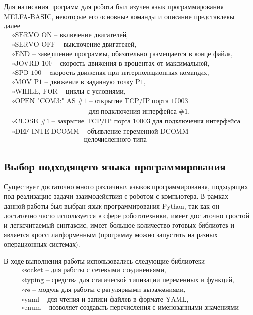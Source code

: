 \documentclass[a4paper,14pt]{extarticle}
\begin{document}
Для написания программ для робота был изучен язык программирования
MELFA-BASIC, некоторые его основные команды и описание представлены
далее
\begin{align*}
    &\circ\text{SERVO ON -- включение двигателей,}\\
    &\circ\text{SERVO OFF -- выключение двигателей,}\\
    &\circ\text{END -- завершение программы, обязательно размещается в конце файла,}\\
    &\circ\text{JOVRD 100 -- скорость движения в процентах от максимальной,}\\
    &\circ\text{SPD 100 -- скорость движения при интерполяционных командах,}\\
    &\circ\text{MOV P1 -- движение в заданную точку P1,}\\
    &\circ\text{WHILE, FOR -- циклы с условиями,}\\
    &\circ\text{OPEN "COM3:" AS \#1 -- открытие TCP/IP порта 10003}\\
    &\,\,\,\,\,\,\,\,\,\,\,\,\,\,\,\,\,\,\,\,\,\,\,\,\,\,\,\,\,\,\,\,\,\,\,\,\,\,\,\,\,\,\,\,\,\,\,\,\,\,\,\,\,\,\,\,\,\,\,\,\,\,\,\,\,\,\,\text{для подключения интерфейса \#1,}\\
    &\circ\text{CLOSE \#1 -- закрытие TCP/IP порта 10003 для подключения интерфейса \#1,}\\
    &\circ\text{DEF INTE DCOMM -- объявление переменной DCOMM}\\
    &\,\,\,\,\,\,\,\,\,\,\,\,\,\,\,\,\,\,\,\,\,\,\,\,\,\,\,\,\,\,\,\,\,\,\,\,\,\,\,\,\,\,\,\,\,\,\,\,\,\,\,\,\,\,\,\,\,\,\,\,\,\,\,\text{целочисленного типа}
\end{align*}


\subsection{Выбор подходящего языка программирования}
Существует достаточно много различных языков программирования,
подходящих под реализацию задачи взаимодействия с роботом с
компьютера. В рамках данной работы был выбран язык
программирования Python, так как он достаточно часто
используется в сфере робототехники, имеет достаточно простой
и легкочитаемый синтаксис,
имеет большое количество готовых библиотек и является кроссплатформенным
(программу можно запустить на разных операционных системах).


В ходе выполнения работы использовались следующие библиотеки
\begin{align*}
    &\circ\text{socket -- для работы с сетевыми соединениями,}\\
    &\circ\text{typing -- средства для статической типизации переменных и функций,}\\
    &\circ\text{re -- модуль для работы с регулярными выражениями,}\\
    &\circ\text{yaml -- для чтения и записи файлов в формате YAML,}\\
    &\circ\text{enum -- позволяет создавать перечисления с именованными значениями}
\end{align*}
\end{document}
